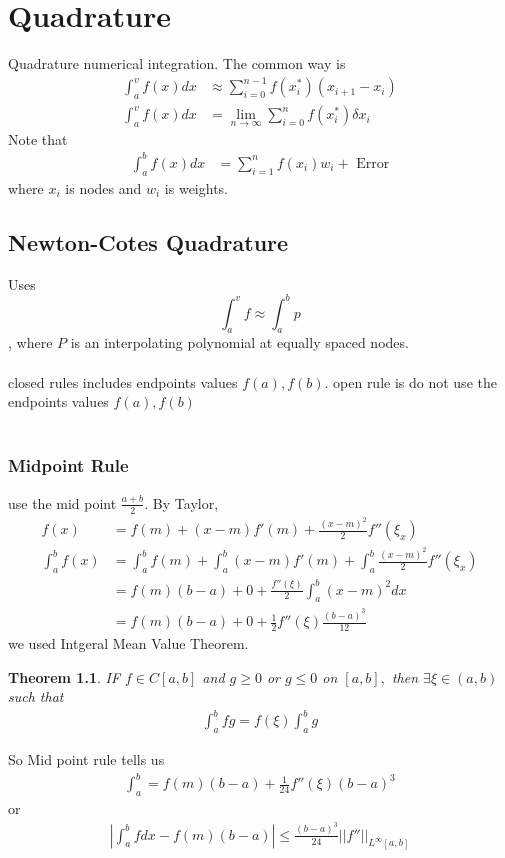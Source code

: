 \documentclass[11pt,oneside]{book}
\theoremstyle{break}
\theoremstyle{break}
\newtheorem{thm}{Theorem}[section]
\begin{document}
\chapter[Quadrature]{Quadrature}
Quadrature numerical integration. The common way is \begin{align*}
\int_{a}^{v}f(x)dx&\approx \sum_{i=0}^{n-1}f(x_i^*)(x_{i+1}-x_i)\\
\int_{a}^{v}f(x)dx&=\lim_{n\to \infty}\sum_{i=0}^nf(x_i^*)\delta x_i
\end{align*}
Note that \begin{align*}
\int_{a}^{b}f(x)dx&=\sum_{i=1}^nf(x_i)w_i+\text{ Error}
\end{align*}
where $x_i$ is nodes and $w_i$ is weights.\section[Newton-Cotes Quadrature]{Newton-Cotes Quadrature}
Uses $$
\int_{a}^{v}f\approx \int_{a}^{b}p
$$, where $P$ is an interpolating polynomial at equally spaced nodes. \\
\hfill\\
 closed rules includes endpoints values $f(a),f(b)$. open rule is  do not use the endpoints values $f(a),f(b)$\\
\hfill\\
\subsection[Midpoint Rule]{Midpoint Rule}
use the mid point $\frac{a+b}{2}$. By Taylor, \begin{align*}
f(x)&=f(m)+(x-m)f'(m)+\frac{(x-m)^2}{2}f''(\xi_{x})\\
\int_{a}^{b}f(x)&=\int_{a}^{b}f(m)+\int_{a}^{b}(x-m)f'(m)+\int_{a}^{b}\frac{(x-m)^2}{2}f''(\xi_{x})\\
&=f(m)(b-a)+0+\frac{f''(\xi)}{2}\int_{a}^{b}(x-m)^2dx\\
&=f(m)(b-a)+0+\frac{1}{2}f''(\xi) \frac{(b-a)^3}{12}
\end{align*}
we used Intgeral Mean Value Theorem. \begin{thm}
IF $f\in C[a,b]$ and $g\geq 0$ or $g\leq 0$ on $[a,b],$ then $\exists \xi\in (a,b)$ such that \begin{align*}
\int_{a}^{b}fg=f(\xi)\int_{a}^bg
\end{align*}

\end{thm}
So Mid point rule tells us \begin{align*}
\int_{a}^{b}=f(m)(b-a)+\frac{1}{24}f''(\xi)(b-a)^3
\end{align*}
or \begin{align*}
\left|\int_{a}^{b}fdx-f(m)(b-a) \right|\leq \frac{(b-a)^3}{24}||f''||_{L^{\infty}[a,b]}
\end{align*}
\end{document}
